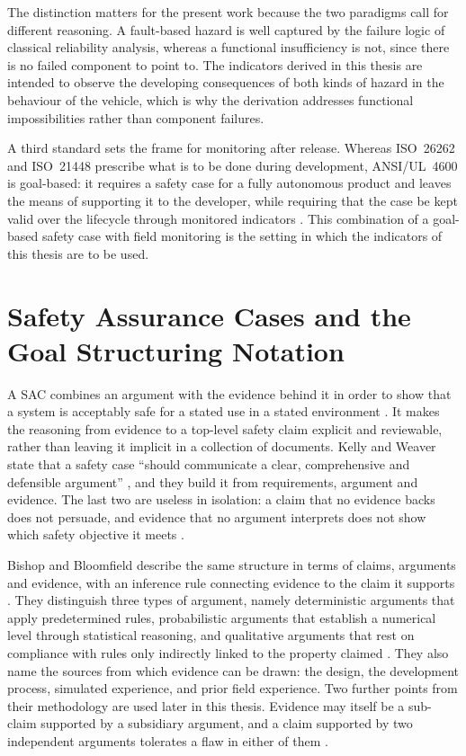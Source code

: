 The distinction matters for the present work because the two paradigms call for
different reasoning. A fault-based hazard is well captured by the failure logic of
classical reliability analysis, whereas a functional insufficiency is not, since there
is no failed component to point to. The indicators derived in this thesis are intended
to observe the developing consequences of both kinds of hazard in the behaviour of the
vehicle, which is why the derivation addresses functional impossibilities rather than
component failures.

A third standard sets the frame for monitoring after release. Whereas ISO~26262 and
ISO~21448 prescribe what is to be done during development, ANSI/UL~4600 is
goal-based: it requires a safety case for a fully autonomous product and leaves the
means of supporting it to the developer, while requiring that the case be kept valid
over the lifecycle through monitored indicators \cite{ul4600} \cite{wang2024sotif}.
This combination of a goal-based safety case with field monitoring is the setting in
which the indicators of this thesis are to be used.

\section{Safety Assurance Cases and the Goal Structuring Notation}
\label{sec:fund_gsn}

A \ac{SAC} combines an argument with the evidence behind it in order to show that a
system is acceptably safe for a stated use in a stated environment
\cite{bishop2000methodology}. It makes
the reasoning from evidence to a top-level safety claim explicit and reviewable, rather
than leaving it implicit in a collection of documents. Kelly and Weaver state that a
safety case ``should communicate a clear, comprehensive and defensible argument''
\cite{kelly2004gsn}, and they build it from requirements, argument and evidence. The
last two are useless in isolation: a claim that no evidence backs does not persuade,
and evidence that no argument interprets does not show which safety objective it
meets \cite{kelly2004gsn}.

Bishop and Bloomfield describe the same structure in terms of claims, arguments and
evidence, with an inference rule connecting evidence to the claim it supports
\cite{bishop2000methodology}. They distinguish three types of argument, namely
deterministic arguments that apply predetermined rules, probabilistic arguments that
establish a numerical level through statistical reasoning, and qualitative arguments
that rest on compliance with rules only indirectly linked to the property claimed
\cite{bishop2000methodology}. They also name the sources from which evidence can be
drawn: the design, the development process, simulated experience, and prior field
experience. Two further points from their methodology are used later in this thesis.
Evidence may itself be a sub-claim supported by a subsidiary argument, and a claim
supported by two independent arguments tolerates a flaw in either of them
\cite{bishop2000methodology}.

